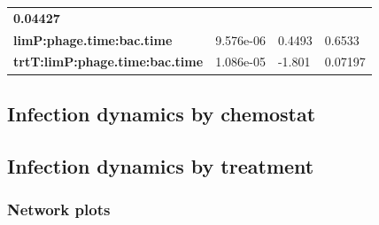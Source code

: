 \documentclass[]{article}
\begin{document}
\begin{longtable}[]{@{}llll@{}}
\begin{minipage}[t]{0.16\columnwidth}
\textbf{0.04427}\strut
\end{minipage}\tabularnewline
\begin{minipage}[t]{0.43\columnwidth}\raggedright\strut
\textbf{limP:phage.time:bac.time}\strut
\end{minipage} & \begin{minipage}[t]{0.17\columnwidth}\raggedright\strut
9.576e-06\strut
\end{minipage} & \begin{minipage}[t]{0.13\columnwidth}\raggedright\strut
0.4493\strut
\end{minipage} & \begin{minipage}[t]{0.16\columnwidth}\raggedright\strut
0.6533\strut
\end{minipage}\tabularnewline
\begin{minipage}[t]{0.43\columnwidth}\raggedright\strut
\textbf{trtT:limP:phage.time:bac.time}\strut
\end{minipage} & \begin{minipage}[t]{0.17\columnwidth}\raggedright\strut
1.086e-05\strut
\end{minipage} & \begin{minipage}[t]{0.13\columnwidth}\raggedright\strut
-1.801\strut
\end{minipage} & \begin{minipage}[t]{0.16\columnwidth}\raggedright\strut
0.07197\strut
\end{minipage}\tabularnewline
\bottomrule
\end{longtable}

\newpage

\subsection{Infection dynamics by
chemostat}\label{infection-dynamics-by-chemostat}

\newpage

\subsection{Infection dynamics by
treatment}\label{infection-dynamics-by-treatment}

\subsubsection{Network plots}\label{network-plots}
\end{document}
